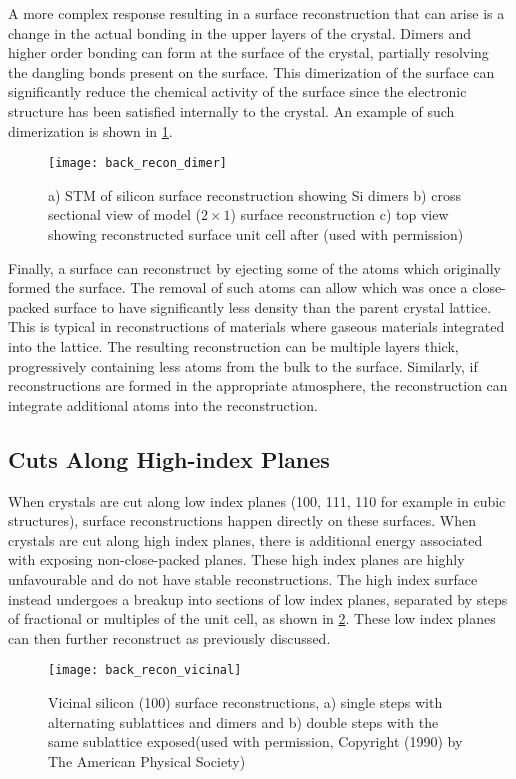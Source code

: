 A more complex response resulting in a surface reconstruction that can arise is a change in the actual bonding in the upper layers of the crystal. Dimers and higher order bonding can form at the surface of the crystal, partially resolving the dangling bonds present on the surface. This dimerization of the surface can significantly reduce the chemical activity of the surface since the electronic structure has been satisfied internally to the crystal\cite{Duke1996}. An example of such dimerization is shown in \cref{fig:back_recon_dimer}.
\begin{figure}
    \centering
    \texttt{[image: back\_recon\_dimer]}
    \caption[Silicon dimer surface reconstruction]{\label{fig:back_recon_dimer}a) STM of silicon surface reconstruction showing Si dimers b) cross sectional view of model (\(2 \times 1\)) surface reconstruction c) top view showing reconstructed surface unit cell after \cite{Zhang1997,Lagally1993}(used with permission)}
\end{figure}

Finally, a surface can reconstruct by ejecting some of the atoms which originally formed the surface. The removal of such atoms can allow which was once a close-packed surface to have significantly less density than the parent crystal lattice. This is typical in reconstructions of materials where gaseous materials integrated into the lattice. The resulting reconstruction can be multiple layers thick, progressively containing less atoms from the bulk to the surface. Similarly, if reconstructions are formed in the appropriate atmosphere, the reconstruction can integrate additional atoms into the reconstruction.

\subsection{Cuts Along High-index Planes}
When crystals are cut along low index planes (100, 111, 110 for example in cubic structures), surface reconstructions happen directly on these surfaces. When crystals are cut along high index planes, there is additional energy associated with exposing non-close-packed planes. These high index planes are highly unfavourable and do not have stable reconstructions. The high index surface instead undergoes a breakup into sections of low index planes, separated by steps of fractional or multiples of the unit cell, as shown in \cref{fig:back_recon_vicinal}. These low index planes can then further reconstruct as previously discussed.
\begin{figure}
    \centering
    \texttt{[image: back\_recon\_vicinal]}
    \caption[Silicon single and double step surface reconstructions]{\label{fig:back_recon_vicinal}Vicinal silicon (100) surface reconstructions, a) single steps with alternating sublattices and dimers and b) double steps with the same sublattice exposed\cite{Alerhand1990}(used with permission, Copyright (1990) by The American Physical Society)}
\end{figure}

